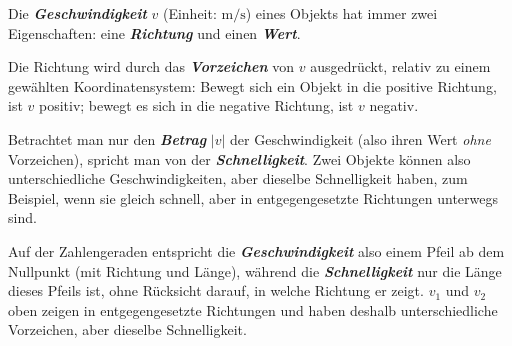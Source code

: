 \documentclass[addpoints,11pt,a4paper]{exam}
\begin{document}
\begin{theoriebox}
Die \textbf{\emph{Geschwindigkeit}} $v$ (Einheit: $\si{\meter\per\second}$)
eines Objekts hat immer zwei Eigenschaften: eine \textbf{\emph{Richtung}}
und einen \textbf{\emph{Wert}}.

Die Richtung wird durch das \textbf{\emph{Vorzeichen}} von $v$
ausgedrückt, relativ zu einem gewählten Koordinatensystem: Bewegt sich
ein Objekt in die positive Richtung, ist $v$ positiv; bewegt es sich in
die negative Richtung, ist $v$ negativ.

Betrachtet man nur den \textbf{\emph{Betrag}} $\lvert v\rvert$ der
Geschwindigkeit (also ihren Wert \emph{ohne} Vorzeichen), spricht man
von der \textbf{\emph{Schnelligkeit}}. Zwei Objekte können also
unterschiedliche Geschwindigkeiten, aber dieselbe Schnelligkeit haben,
zum Beispiel, wenn sie gleich schnell, aber in entgegengesetzte
Richtungen unterwegs sind.

\begin{center}
\end{center}
Auf der Zahlengeraden entspricht die \textbf{\emph{Geschwindigkeit}}
also einem Pfeil ab dem Nullpunkt (mit Richtung und Länge), während die
\textbf{\emph{Schnelligkeit}} nur die Länge dieses Pfeils ist, ohne
Rücksicht darauf, in welche Richtung er zeigt. $v_1$ und $v_2$ oben
zeigen in entgegengesetzte Richtungen und haben deshalb unterschiedliche
Vorzeichen, aber dieselbe Schnelligkeit.
\end{theoriebox}
\end{document}
